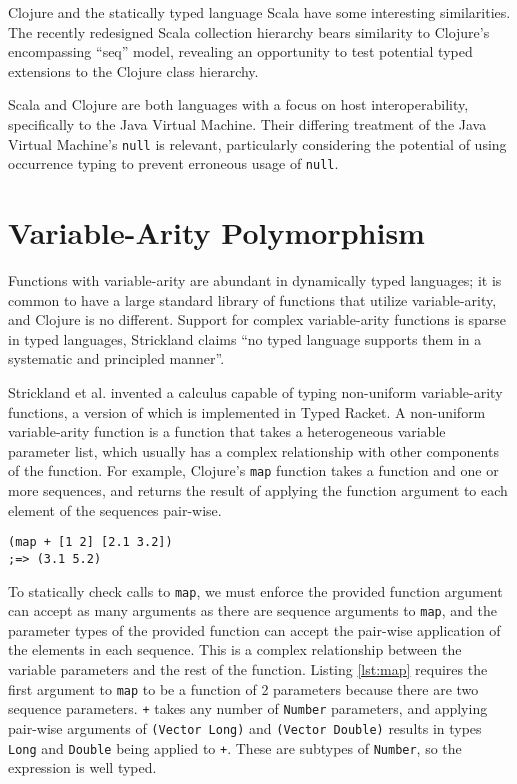 \documentclass[12pt, a4paper]{article}
\begin{document}
Clojure and the statically typed language Scala \cite{Odersky06anoverview} 
have some interesting similarities. The recently redesigned 
Scala collection hierarchy
\cite{Odersky06anoverview} \cite{Scala:Collections}
bears similarity to Clojure's encompassing ``seq''
model, revealing an opportunity to test potential typed extensions to the Clojure 
class hierarchy. 

Scala and Clojure are both languages with a focus on host interoperability, specifically
to the Java Virtual Machine. Their differing treatment of the Java Virtual Machine's \lstinline|null| is
relevant, particularly considering the potential of using occurrence typing \cite{Tobin-Hochstadt:2010:LTU:1932681.1863561}
to prevent erroneous usage of \lstinline|null|.

\section{Variable-Arity Polymorphism}

Functions with variable-arity are abundant in dynamically typed languages;
it is common to have a large standard library of functions that utilize
variable-arity, and Clojure is no different. 
Support for complex variable-arity functions is sparse in typed languages,
Strickland claims \cite{Strickland:2009:PVP:1532974.1532978}
``no typed language supports them in a systematic and principled manner''.

Strickland et al. invented \cite{Strickland:2009:PVP:1532974.1532978} 
a calculus capable of typing non-uniform variable-arity functions, a version of which
is implemented in Typed Racket. A non-uniform variable-arity function is a function that
takes a heterogeneous variable parameter list, which usually has a complex relationship 
with other components of the function.
For example, Clojure's \lstinline|map| function takes a function and one or more sequences,
and returns the result of applying the function argument to each element of the sequences pair-wise.

\begin{lstlisting}[caption=An application of the non-uniform variable-arity function \lstinline|map|, label=lst:map]
(map + [1 2] [2.1 3.2]) 
;=> (3.1 5.2)
\end{lstlisting}

To statically check calls to \lstinline|map|, we must enforce the provided function argument can accept as many
arguments as there are sequence arguments to \lstinline|map|, and the parameter types of the provided function can accept
the pair-wise application of the elements in each sequence. This is a complex relationship between the variable parameters and
the rest of the function.
Listing \ref{lst:map} requires the first argument to \lstinline|map| to be a function of 2 parameters because
there are two sequence parameters. \lstinline|+| takes any number of \lstinline|Number| parameters, 
and applying pair-wise arguments of \lstinline|(Vector Long)| and \lstinline|(Vector Double)| 
results in types \lstinline|Long| and \lstinline|Double| being applied to \lstinline|+|. These are subtypes
of \lstinline|Number|, so the expression is well typed.
\end{document}
